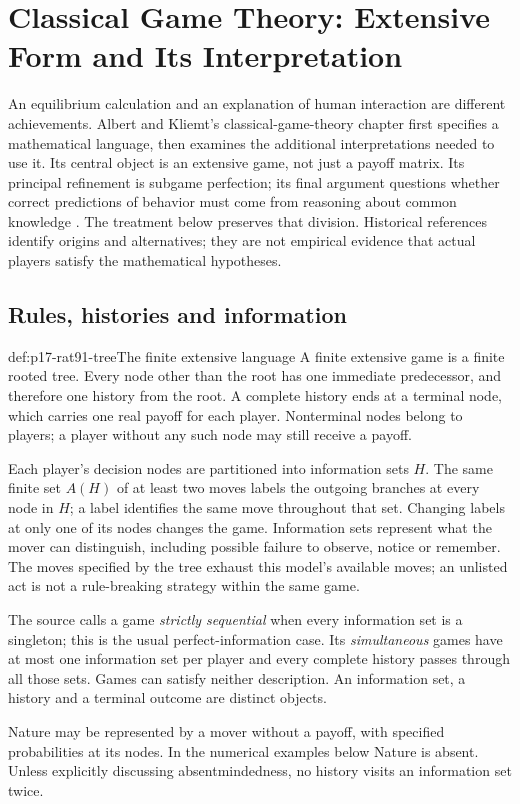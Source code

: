 \chapter{Classical Game Theory: Extensive Form and Its Interpretation}
\label{sec:p17-rationality-9-1}

An equilibrium calculation and an explanation of human interaction are
different achievements. Albert and Kliemt's classical-game-theory chapter
first specifies a mathematical language, then examines the additional
interpretations needed to use it. Its central object is an extensive game,
not just a payoff matrix. Its principal refinement is subgame perfection;
its final argument questions whether correct predictions of behavior must
come from reasoning about common knowledge
\parencite[chap.~9.1, pp.~529--541]{AlbertKliemt2021ClassicalGameTheory}.
The treatment below preserves that division. Historical references identify
origins and alternatives; they are not empirical evidence that actual players
satisfy the mathematical hypotheses.

\section{Rules, histories and information}

\begin{hbdefinition}{def:p17-rat91-tree}{The finite extensive language}
A finite extensive game is a finite rooted tree. Every node other than
the root has one immediate predecessor, and therefore one history from
the root. A complete history ends at a terminal node, which carries
one real payoff for each player. Nonterminal nodes belong to players;
a player without any such node may still receive a payoff.

Each player's decision nodes are partitioned into information sets
\(H\). The same finite set \(A(H)\) of at least two moves labels the
outgoing branches at every node in \(H\); a label identifies the same
move throughout that set. Changing labels at only one of its nodes
changes the game. Information sets represent what the mover can
distinguish, including possible failure to observe, notice or remember.
The moves specified by the tree exhaust this model's available moves;
an unlisted act is not a rule-breaking strategy within the same game.

The source calls a game \emph{strictly sequential} when every
information set is a singleton; this is the usual perfect-information
case. Its \emph{simultaneous} games have at most one information set
per player and every complete history passes through all those sets.
Games can satisfy neither description. An information set, a history
and a terminal outcome are distinct objects.

Nature may be represented by a mover without a payoff, with specified
probabilities at its nodes. In the numerical examples below Nature
is absent. Unless explicitly discussing absentmindedness, no history
visits an information set twice.
\end{hbdefinition}

